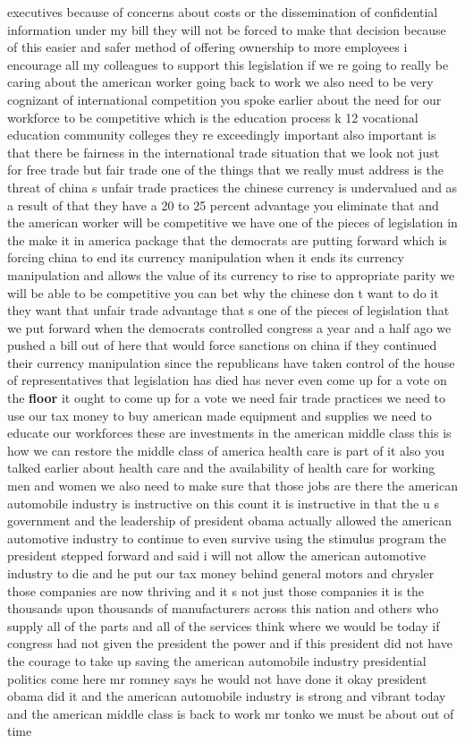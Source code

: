 \documentclass{article}
\begin{document}
executives because of concerns about costs or the dissemination of confidential information under my bill they will not be forced to make that decision because of this easier and safer method of offering ownership to more employees i encourage all my colleagues to support this legislation
\vspace{8mm}
if we re going to really be caring about the american worker going back to work we also need to be very cognizant of international competition you spoke earlier about the need for our workforce to be competitive which is the education process k 12 vocational education community colleges they re exceedingly important also important is that there be fairness in the international trade situation that we look not just for free trade but fair trade one of the things that we really must address is the threat of china s unfair trade practices the chinese currency is undervalued and as a result of that they have a 20 to 25 percent advantage you eliminate that and the american worker will be competitive we have one of the pieces of legislation in the make it in america package that the democrats are putting forward which is forcing china to end its currency manipulation when it ends its currency manipulation and allows the value of its currency to rise to appropriate parity we will be able to be competitive you can bet why the chinese don t want to do it they want that unfair trade advantage that s one of the pieces of legislation that we put forward when the democrats controlled congress a year and a half ago we pushed a bill out of here that would force sanctions on china if they continued their currency manipulation since the republicans have taken control of the house of representatives that legislation has died has never even come up for a vote on the {\bf \color{red} floor} it ought to come up for a vote we need fair trade practices we need to use our tax money to buy american made equipment and supplies we need to educate our workforces these are investments in the american middle class this is how we can restore the middle class of america health care is part of it also you talked earlier about health care and the availability of health care for working men and women we also need to make sure that those jobs are there the american automobile industry is instructive on this count it is instructive in that the u s government and the leadership of president obama actually allowed the american automotive industry to continue to even survive using the stimulus program the president stepped forward and said i will not allow the american automotive industry to die and he put our tax money behind general motors and chrysler those companies are now thriving and it s not just those companies it is the thousands upon thousands of manufacturers across this nation and others who supply all of the parts and all of the services think where we would be today if congress had not given the president the power and if this president did not have the courage to take up saving the american automobile industry presidential politics come here mr romney says he would not have done it okay president obama did it and the american automobile industry is strong and vibrant today and the american middle class is back to work mr tonko we must be about out of time
\end{document}
